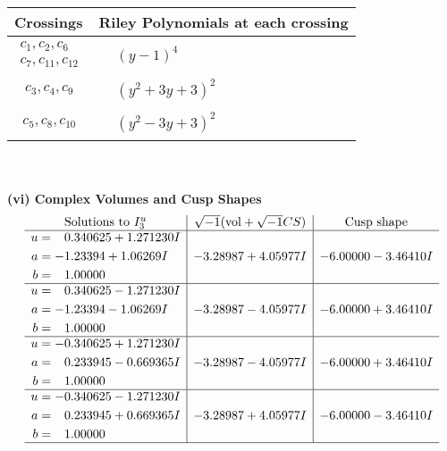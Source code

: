 \documentclass[1p]{elsarticle_modified}
\theoremstyle{definition}
\newcommand{\I}{\sqrt{-1}}
\begin{document}
\begin{tabular}{m{50pt}|m{274pt}}
Crossings & \hspace{64pt}Riley Polynomials at each crossing \\
\hline $$\begin{aligned}c_{1},c_{2},c_{6}\\c_{7},c_{11},c_{12}\end{aligned}$$&$\begin{aligned}
&(y-1)^4
\end{aligned}$\\
\hline $$\begin{aligned}c_{3},c_{4},c_{9}\end{aligned}$$&$\begin{aligned}
&(y^2+3 y+3)^2
\end{aligned}$\\
\hline $$\begin{aligned}c_{5},c_{8},c_{10}\end{aligned}$$&$\begin{aligned}
&(y^2-3 y+3)^2
\end{aligned}$\\
\hline
\end{tabular}\\~\\
\newpage\flushleft \textbf{(vi) Complex Volumes and Cusp Shapes}
$$\begin{array}{c|c|c}  
\text{Solutions to }I^u_{3}& \I (\text{vol} + \sqrt{-1}CS) & \text{Cusp shape}\\
 \hline 
\begin{aligned}
u &= \phantom{-}0.340625 + 1.271230 I \\
a &= -1.23394 + 1.06269 I \\
b &= \phantom{-}1.00000\phantom{ +0.000000I}\end{aligned}
 & -3.28987 + 4.05977 I & -6.00000 - 3.46410 I \\ \hline\begin{aligned}
u &= \phantom{-}0.340625 - 1.271230 I \\
a &= -1.23394 - 1.06269 I \\
b &= \phantom{-}1.00000\phantom{ +0.000000I}\end{aligned}
 & -3.28987 - 4.05977 I & -6.00000 + 3.46410 I \\ \hline\begin{aligned}
u &= -0.340625 + 1.271230 I \\
a &= \phantom{-}0.233945 - 0.669365 I \\
b &= \phantom{-}1.00000\phantom{ +0.000000I}\end{aligned}
 & -3.28987 - 4.05977 I & -6.00000 + 3.46410 I \\ \hline\begin{aligned}
u &= -0.340625 - 1.271230 I \\
a &= \phantom{-}0.233945 + 0.669365 I \\
b &= \phantom{-}1.00000\phantom{ +0.000000I}\end{aligned}
 & -3.28987 + 4.05977 I & -6.00000 - 3.46410 I\\
 \hline 
 \end{array}$$\newpage\newpage\renewcommand{\arraystretch}{1}
\end{document}
